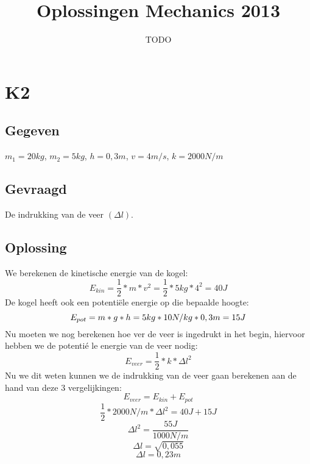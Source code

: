 \documentclass[10pt,a4paper]{article}
\title{Oplossingen Mechanics 2013}
\author{TODO}
\begin{document}
\maketitle
\pagebreak
\tableofcontents
\pagebreak

\section{K2}
\subsection{Gegeven}
$m_{1} = 20kg$,  $m_{2} = 5 kg$,  $h = 0,3m$,  $v = 4m/s$,  $k=2000N/m $

\subsection{Gevraagd}
De indrukking van de veer $(\Delta l)$. 

\subsection{Oplossing}
We berekenen de kinetische energie van de kogel:\\
\[
E_{kin} = \frac{1}{2}*m*v^{2} = \frac{1}{2}*5kg*4^{2} = 40J
\]
De kogel heeft ook een potentiële energie op die bepaalde hoogte:\\
\[
E_{pot} = m*g*h = 5kg* 10 N/kg * 0,3m = 15J\\
\]
Nu moeten we nog berekenen hoe ver de veer is ingedrukt in het begin, hiervoor hebben we de potenti\'e le energie van de veer nodig:\\
\[
E_{veer} = \frac{1}{2}*k*\Delta l^{2}
\]
Nu we dit weten kunnen we de indrukking van de veer gaan berekenen aan de hand van deze 3 vergelijkingen:\\
\[
E_{veer} = E_{kin} + E_{pot}
\]
\[
\frac{1}{2}*2000N/m*\Delta l^{2} = 40J + 15J
\]
\[
\Delta l^{2} = \frac{55J}{1000N/m}
\]
\[
\Delta l = \sqrt{0,055}
\]
\[
\Delta l = 0,23m
\]
\end{document}
